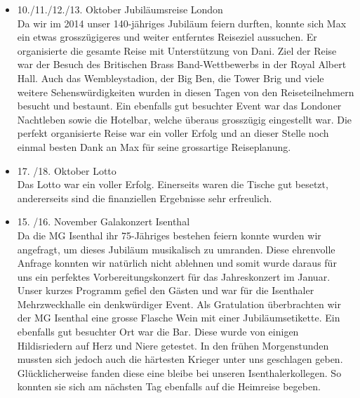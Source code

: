 \begin{history}
\begin{itemize}
            \item 10./11./12./13. Oktober Jubiläumsreise London\\
                  Da wir im 2014 unser 140-jähriges Jubiläum feiern durften, konnte sich
                  Max ein etwas grosszügigeres und weiter entferntes Reiseziel aussuchen.
                  Er organisierte die gesamte Reise mit Unterstützung von Dani. Ziel der
                  Reise war der Besuch des Britischen Brass Band-Wettbewerbs in der Royal
                  Albert Hall. Auch das Wembleystadion, der Big Ben, die Tower Brig und
                  viele weitere Sehenswürdigkeiten wurden in diesen Tagen von den
                  Reiseteilnehmern besucht und bestaunt. Ein ebenfalls gut besuchter Event
                  war das Londoner Nachtleben sowie die Hotelbar, welche überaus
                  grosszügig eingestellt war.  Die perfekt organisierte Reise war ein
                  voller Erfolg und an dieser Stelle noch einmal besten Dank an Max für
                  seine grossartige Reiseplanung.

            \item 17. /18. Oktober Lotto\\
                  Das Lotto war ein voller Erfolg. Einerseits waren die Tische gut
                  besetzt, andererseits sind die finanziellen Ergebnisse sehr erfreulich.

            \item 15. /16. November Galakonzert Isenthal\\
                  Da die MG Isenthal ihr 75-Jähriges bestehen feiern konnte wurden wir
                  angefragt, um dieses Jubiläum musikalisch zu umranden. Diese ehrenvolle
                  Anfrage konnten wir natürlich nicht ablehnen und somit wurde daraus für
                  uns ein perfektes Vorbereitungskonzert für das Jahreskonzert im Januar.
                  Unser kurzes Programm gefiel den Gästen und war für die Isenthaler
                  Mehrzweckhalle ein denkwürdiger Event. Als Gratulation überbrachten wir
                  der MG Isenthal eine grosse Flasche Wein mit einer Jubiläumsetikette.
                  Ein ebenfalls gut besuchter Ort war die Bar. Diese wurde von einigen
                  Hildisriedern auf Herz und Niere getestet. In den frühen Morgenstunden
                  mussten sich jedoch auch die härtesten Krieger unter uns geschlagen
                  geben. Glücklicherweise fanden diese eine bleibe bei unseren
                  Isenthalerkollegen. So konnten sie sich am nächsten Tag ebenfalls auf
                  die Heimreise begeben.


      \end{itemize}

\end{history}
